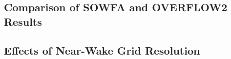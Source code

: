 
\subsection{Comparison of SOWFA and OVERFLOW2 Results}\label{section5-4-1}


\subsection{Effects of Near-Wake Grid Resolution}\label{section5-4-3}

